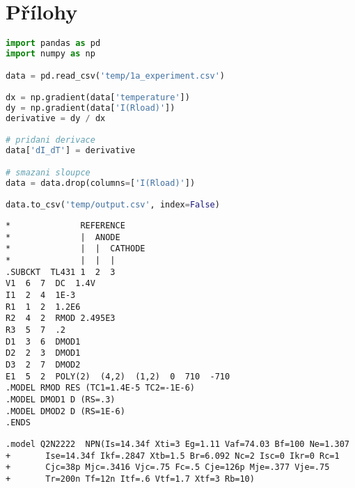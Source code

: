 \documentclass[12pt]{CLASS/protokol}
\begin{document}
\clearpage
\newpage
\printbibliography

\newpage
\clearpage
\section{Přílohy}
\begin{lstlisting}[language=Python,label=ls:num_der,caption=Jednoduchý program pro numerickou derivaci dat z~experimentu~\ref{subsec:1a}]
import pandas as pd
import numpy as np

data = pd.read_csv('temp/1a_experiment.csv')

dx = np.gradient(data['temperature'])
dy = np.gradient(data['I(Rload)'])
derivative = dy / dx

# pridani derivace
data['dI_dT'] = derivative

# smazani sloupce
data = data.drop(columns=['I(Rload)'])

data.to_csv('temp/output.csv', index=False)
\end{lstlisting}

\begin{lstlisting}[label=ls:LT431,caption=Popis modelu klíčové součástky TL431 \cite{TL431_spice_model}]
*              REFERENCE
*              |  ANODE
*              |  |  CATHODE
*              |  |  |
.SUBCKT  TL431 1  2  3
V1  6  7  DC  1.4V
I1  2  4  1E-3
R1  1  2  1.2E6
R2  4  2  RMOD 2.495E3
R3  5  7  .2
D1  3  6  DMOD1
D2  2  3  DMOD1
D3  2  7  DMOD2
E1  5  2  POLY(2)  (4,2)  (1,2)  0  710  -710
.MODEL RMOD RES (TC1=1.4E-5 TC2=-1E-6)
.MODEL DMOD1 D (RS=.3)
.MODEL DMOD2 D (RS=1E-6)
.ENDS
\end{lstlisting}
\newpage
\clearpage
\begin{lstlisting}[label=ls:LT431,caption=Popis modelu bipolárního tranzistoru Q2N2222 poskytnutého vyučujícím]
.model Q2N2222	NPN(Is=14.34f Xti=3 Eg=1.11 Vaf=74.03 Bf=100 Ne=1.307
+		Ise=14.34f Ikf=.2847 Xtb=1.5 Br=6.092 Nc=2 Isc=0 Ikr=0 Rc=1
+		Cjc=38p Mjc=.3416 Vjc=.75 Fc=.5 Cje=126p Mje=.377 Vje=.75
+		Tr=200n Tf=12n Itf=.6 Vtf=1.7 Xtf=3 Rb=10)
\end{lstlisting}
\end{document}
